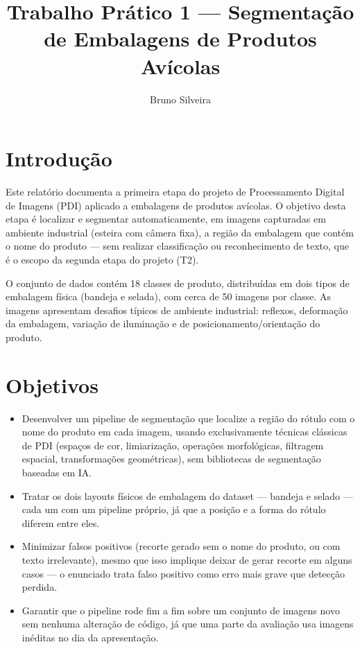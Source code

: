 \documentclass[a4paper,11pt]{article}
\title{Trabalho Prático 1 --- Segmentação de Embalagens de Produtos Avícolas}
\author{Bruno Silveira}
\date{}
\begin{document}
\maketitle

\section{Introdução}

Este relatório documenta a primeira etapa do projeto de Processamento Digital de Imagens (PDI)
aplicado a embalagens de produtos avícolas. O objetivo desta etapa é localizar e segmentar
automaticamente, em imagens capturadas em ambiente industrial (esteira com câmera fixa), a
região da embalagem que contém o nome do produto --- sem realizar classificação ou
reconhecimento de texto, que é o escopo da segunda etapa do projeto (T2).

O conjunto de dados contém 18 classes de produto, distribuídas em dois tipos de embalagem física
(bandeja e selada), com cerca de 50 imagens por classe. As imagens apresentam desafios típicos de
ambiente industrial: reflexos, deformação da embalagem, variação de iluminação e de
posicionamento/orientação do produto.

\section{Objetivos}

\begin{itemize}[nosep]
  \item Desenvolver um pipeline de segmentação que localize a região do rótulo com o nome do
        produto em cada imagem, usando exclusivamente técnicas clássicas de PDI (espaços de cor,
        limiarização, operações morfológicas, filtragem espacial, transformações geométricas),
        sem bibliotecas de segmentação baseadas em IA.
  \item Tratar os dois layouts físicos de embalagem do dataset --- bandeja e selado --- cada um
        com um pipeline próprio, já que a posição e a forma do rótulo diferem entre eles.
  \item Minimizar falsos positivos (recorte gerado sem o nome do produto, ou com texto
        irrelevante), mesmo que isso implique deixar de gerar recorte em alguns casos --- o
        enunciado trata falso positivo como erro mais grave que detecção perdida.
  \item Garantir que o pipeline rode fim a fim sobre um conjunto de imagens novo sem nenhuma
        alteração de código, já que uma parte da avaliação usa imagens inéditas no dia da
        apresentação.
\end{itemize}
\end{document}
